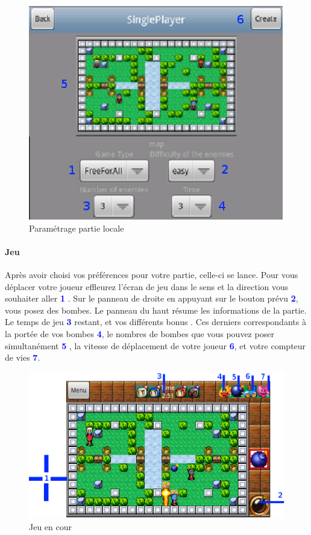 	\begin{figure}[h]
	\centering
		\includegraphics[scale=0.7]{Manuel/Img/15.eps}
		\caption{Paramétrage partie locale}
	\end{figure}
	
	\paragraph{Jeu\\}
	Après avoir choisi vos préférences pour votre partie, celle-ci se lance.
	Pour vous déplacer votre joueur effleurez l'écran de jeu dans le sens et la
	direction vous souhaiter aller \textcolor{blue}{\textbf{1}} .	
	Sur le panneau de droite en appuyant sur le
	bouton prévu \textcolor{blue}{\textbf{2}}, vous posez des bombes.
	Le panneau du haut résume les informations de la partie. Le temps de jeu
	\textcolor{blue}{\textbf{3}} restant, et vos différents bonus . Ces derniers
	correspondants à la portée de vos bombes \textcolor{blue}{\textbf{4}}, le
	nombres de bombes que vous pouvez poser
	simultanément \textcolor{blue}{\textbf{5}} , la vitesse de déplacement de votre
	joueur \textcolor{blue}{\textbf{6}}, et votre compteur de vies
	\textcolor{blue}{\textbf{7}}.
	
	\begin{figure}[h]
	\centering
		\includegraphics[scale=0.6]{Manuel/Img/21.eps}
		\caption{Jeu en cour}
	\end{figure}
	
